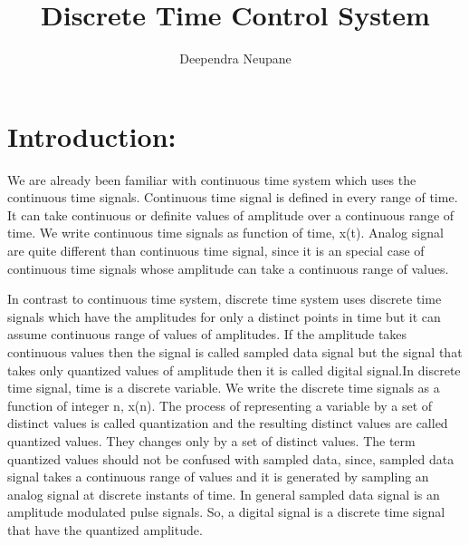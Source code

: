 \documentclass{article}
\title{Discrete Time Control System}
\author{Deependra Neupane}
\begin{document}
\section{Introduction:}
We are already been familiar with continuous time system which uses the continuous time signals. Continuous time signal is defined in every range of time. It can take continuous or definite values of amplitude over a continuous range of time. We write continuous time signals as function of time, x(t). Analog signal are quite different than continuous time signal, since it is an special case of continuous time signals whose amplitude can take a continuous range of values.

In contrast to continuous time system, discrete time system uses discrete time signals which have the amplitudes for only a distinct points in time but it can assume continuous range of values of amplitudes. If the amplitude takes continuous values then the signal is called sampled data signal but the signal that takes only quantized values of amplitude then it is called digital signal.In discrete time signal, time is a discrete variable. We write the discrete time signals as a function of integer n, x(n). The process of representing a variable by a set of distinct values is called quantization and the resulting distinct values are called quantized values. They changes only by a set of distinct values. The term quantized values should not be confused with sampled data, since, sampled data signal takes a continuous range of values and it is generated by sampling an analog signal at discrete instants of time. In general sampled data signal is an amplitude modulated pulse signals. So, a digital signal is a discrete time signal that have the quantized amplitude.
\end{document}
